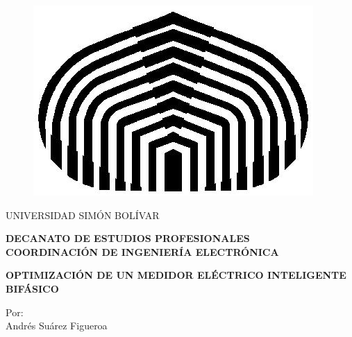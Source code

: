 \thispagestyle{empty}
    \begin{figure}[!ht]
        \begin{center}
            \includegraphics[scale=0.3]{../Imagenes/cebolla.jpg}
        \end{center}
    \end{figure}

    \vspace{-1.cm}

    \begin{center}
		\begin{large}
			UNIVERSIDAD SIMÓN BOLÍVAR\\
		\end{large}
    		\textbf{DECANATO DE ESTUDIOS PROFESIONALES}\\
	  		\textbf{COORDINACIÓN DE INGENIERÍA ELECTRÓNICA}\\

    \end{center}



    \vspace{2.4cm}
    \begin{center}
   \textbf{OPTIMIZACIÓN DE UN MEDIDOR ELÉCTRICO INTELIGENTE BIFÁSICO}\\
    \end{center}

    \vspace{1.7cm}
    \begin{center}
        Por:\\
        Andrés Suárez Figueroa
    \end{center}

